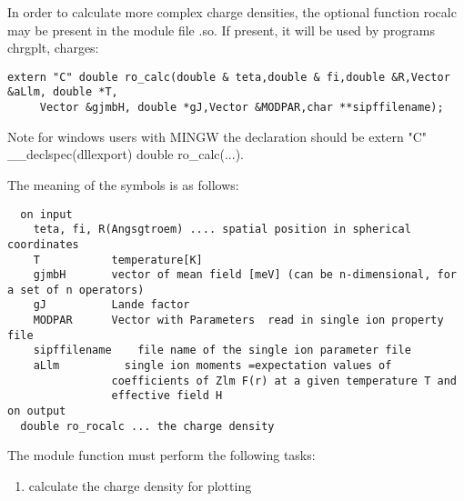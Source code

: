 In order to calculate more complex charge densities, the optional function
{\prg rocalc} may be present in the module file {\prg *.so}. If present,
it will be used by programs {\prg chrgplt},
{\prg charges}:

\begin{verbatim}
extern "C" double ro_calc(double & teta,double & fi,double &R,Vector &aLlm, double *T,
     Vector &gjmbH, double *gJ,Vector &MODPAR,char **sipffilename);
\end{verbatim}

Note for windows users with MINGW the declaration should be {\prg extern "C" \_\_declspec(dllexport) double %
ro\_calc(...)}.

The meaning of the symbols is as follows:
{\footnotesize
\begin{verbatim}
  on input
    teta, fi, R(Angsgtroem) .... spatial position in spherical coordinates
    T           temperature[K]
    gjmbH       vector of mean field [meV] (can be n-dimensional, for a set of n operators)
    gJ          Lande factor
    MODPAR      Vector with Parameters  read in single ion property file
    sipffilename    file name of the single ion parameter file
    aLlm          single ion moments =expectation values of
                coefficients of Zlm F(r) at a given temperature T and
                effective field H
on output
  double ro_rocalc ... the charge density
\end{verbatim}
}

The module function must perform the following tasks:
\begin{enumerate}
\item calculate the charge density for plotting
\end{enumerate}


